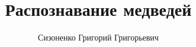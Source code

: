 \documentclass{fefu}
\author{Сизоненко Григорий Григорьевич}
\title{Распознавание медведей}
\newif\ifpractice
\begin{document}
	\ifpractice
	\maketitle{practice}
	\maketableofcontents
	\section*{Введение}
	
	\newpage
	\section{Основная часть}
	
	\newpage
	\section*{Заключение}
	
	\newpage
	\printbibliography
	
	
	\else
	\makethesistitlebackside
	\fi
\end{document}

